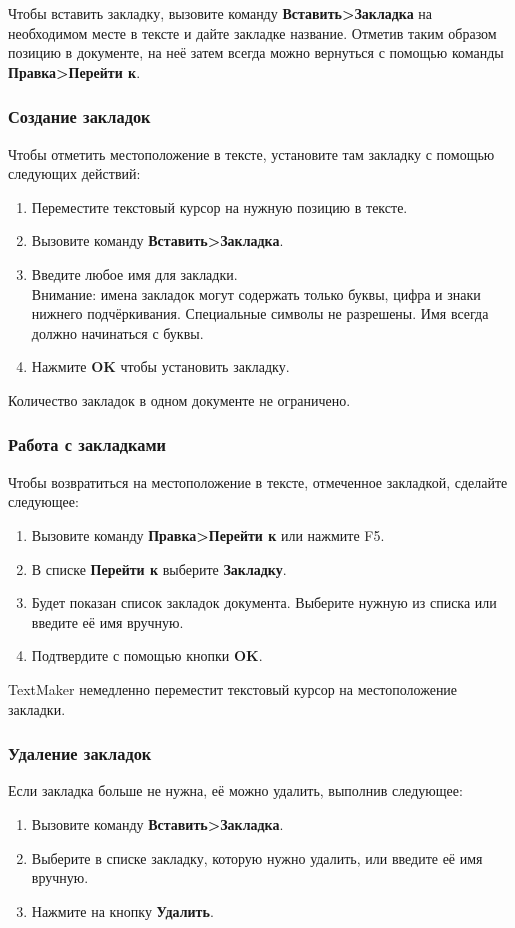 ﻿\documentclass[a4paper,10pt]{article}
\begin{document}
Чтобы вставить закладку, вызовите команду \textbf{Вставить>Закладка} на необходимом месте в тексте и дайте закладке название. Отметив таким образом позицию в документе, на неё затем всегда можно вернуться с помощью команды \textbf{Правка>Перейти к}.

\subsubsection{Создание закладок}
Чтобы отметить местоположение в тексте, установите там закладку с помощью следующих действий:
\begin{enumerate}
 \item Переместите текстовый курсор на нужную позицию в тексте.
 \item Вызовите команду \textbf{Вставить>Закладка}.
 \item Введите любое имя для закладки.\\
 {\footnotesize Внимание: имена закладок могут содержать только буквы, цифра и знаки нижнего подчёркивания. Специальные символы не разрешены. Имя всегда должно начинаться с буквы.}
 \item Нажмите \textbf{OK} чтобы установить закладку.
\end{enumerate}

Количество закладок в одном документе не ограничено.

\subsubsection{Работа с закладками}
Чтобы возвратиться на местоположение в тексте, отмеченное закладкой, сделайте следующее:
\begin{enumerate}
 \item Вызовите команду \textbf{Правка>Перейти к} или нажмите F5.
 \item В списке \textbf{Перейти к } выберите \textbf{Закладку}.
 \item Будет показан список закладок документа. Выберите нужную из списка или введите её имя вручную.
 \item Подтвердите с помощью кнопки \textbf{OK}.
\end{enumerate}

TextMaker немедленно переместит текстовый курсор на местоположение закладки.

\subsubsection{Удаление закладок}
Если закладка больше не нужна, её можно удалить, выполнив следующее:
\begin{enumerate}
 \item Вызовите команду \textbf{Вставить>Закладка}.
 \item Выберите в списке закладку, которую нужно удалить, или введите её имя вручную.
 \item Нажмите на кнопку \textbf{Удалить}.
\end{enumerate}
\end{document}
